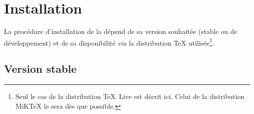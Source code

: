 \chapter{Installation}
\label{cha:installation}

\lstset{%
  basicstyle=\ttfamily\NoAutoSpacing,
  columns=flexible,
  frame=single
}

La procédure d'installation de la \yatcl{} dépend de sa version souhaitée
(stable ou de développement) et de sa disponibilité \emph{via} la distribution
\TeX{} utilisée\footnote{Seul le cas de la distribution \TeX~Live est décrit
  ici. Celui de la distribution MiK\TeX{} le sera dès que possible.}.

\section{Version stable}
\label{sec:version-stable}

